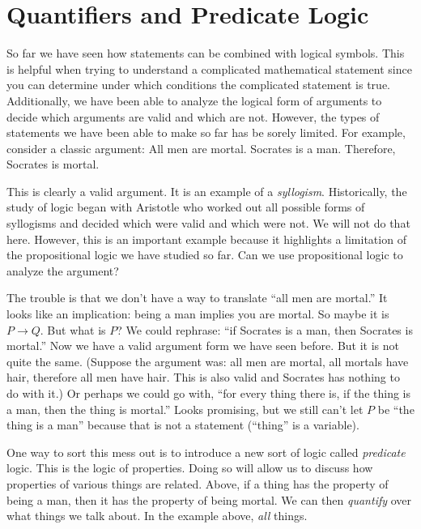 \documentclass[10pt,]{book}
\theoremstyle{plain}
\theoremstyle{definition}
\theoremstyle{definition}
\theoremstyle{definition}
\numberwithin{equation}{chapter}
\def\imp{\rightarrow}
\begin{document}
\section[Quantifiers and Predicate Logic]{Quantifiers and Predicate Logic}\label{sec_quantifiers}
\typeout{************************************************}
\typeout{************************************************}

      So far we have seen how statements can be combined with logical symbols. This is helpful when trying to understand a complicated mathematical statement since you can determine under which conditions the complicated statement is true. Additionally, we have been able to analyze the logical form of arguments to decide which arguments are valid and which are not. However, the types of statements we have been able to make so far has be sorely limited. For example, consider a classic argument:
All men are mortal. Socrates is a man. Therefore, Socrates is mortal.\par

      This is clearly a valid argument. It is an example of a \emph{syllogism}. Historically, the study of logic began with Aristotle who worked out all possible forms of syllogisms and decided which were valid and which were not. We will not do that here. However, this is an important example because it highlights a limitation of the propositional logic we have studied so far. Can we use propositional logic to analyze the argument?
\par

      The trouble is that we don't have a way to translate ``all men are mortal.'' It looks like an implication: being a man implies you are mortal. So maybe it is \(P \imp Q\). But what is \(P\)? We could rephrase: ``if Socrates is a man, then Socrates is mortal.'' Now we have a valid argument form we have seen before. But it is not quite the same. (Suppose the argument was: all men are mortal, all mortals have hair, therefore all men have hair. This is also valid and Socrates has nothing to do with it.) Or perhaps we could go with, ``for every thing there is, if the thing is a man, then the thing is mortal.'' Looks promising, but we still can't let \(P\) be ``the thing is a man'' because that is not a statement (``thing'' is a variable).
\par

      One way to sort this mess out is to introduce a new sort of logic called \emph{predicate} logic. This is the logic of properties. Doing so will allow us to discuss how properties of various things are related. Above, if a thing has the property of being a man, then it has the property of being mortal. We can then \emph{quantify} over what things we talk about. In the example above, \emph{all} things.
\par
\end{document}
